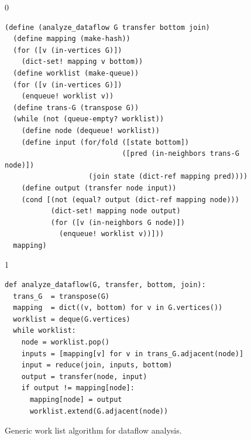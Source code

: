 \documentclass[7x10]{TimesAPriori_MIT}%
\def\racketEd{0}
\def\pythonEd{1}
\def\edition{1}
\newcommand{\pythonColor}[0]{}
\numberwithin{theorem}{chapter}
\numberwithin{definition}{chapter}
\numberwithin{equation}{chapter}
\begin{document}
\begin{figure}[tb]
\begin{tcolorbox}[colback=white]  
{\if\edition\racketEd    
\begin{lstlisting}
(define (analyze_dataflow G transfer bottom join)
  (define mapping (make-hash))
  (for ([v (in-vertices G)])
    (dict-set! mapping v bottom))
  (define worklist (make-queue))
  (for ([v (in-vertices G)])
    (enqueue! worklist v))
  (define trans-G (transpose G))
  (while (not (queue-empty? worklist))
    (define node (dequeue! worklist)) 
    (define input (for/fold ([state bottom])
                            ([pred (in-neighbors trans-G node)])
                    (join state (dict-ref mapping pred))))
    (define output (transfer node input))
    (cond [(not (equal? output (dict-ref mapping node)))
           (dict-set! mapping node output)
           (for ([v (in-neighbors G node)])
             (enqueue! worklist v))]))
  mapping)
\end{lstlisting}
\fi}
{\if\edition\pythonEd\pythonColor
\begin{lstlisting}
def analyze_dataflow(G, transfer, bottom, join):
  trans_G  = transpose(G)
  mapping  = dict((v, bottom) for v in G.vertices())
  worklist = deque(G.vertices)
  while worklist:
    node = worklist.pop()
    inputs = [mapping[v] for v in trans_G.adjacent(node)]
    input = reduce(join, inputs, bottom)
    output = transfer(node, input)
    if output != mapping[node]:
      mapping[node] = output
      worklist.extend(G.adjacent(node))
\end{lstlisting}
\fi}
\end{tcolorbox}

\caption{Generic work list algorithm for dataflow analysis.}
  \label{fig:generic-dataflow}
\end{figure}
\end{document}
